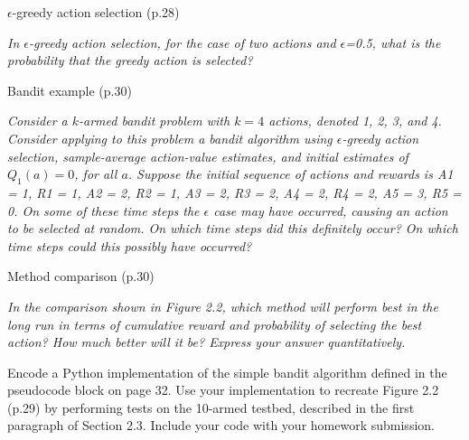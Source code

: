 \documentclass[12pt,letterpaper]{exam}
\newcommand\chapter{1}
\begin{document}
\begin{questions}
	\question%
	$\epsilon$-greedy action selection (p.28)
	
	\emph{In $\epsilon$-greedy action selection, for the case of two actions and $\epsilon$=0.5, 
	what is the probability that the greedy action is selected?}

	\begin{solution}
	
	\end{solution}
	
	\question%
	Bandit example (p.30)
	
	\emph{Consider a $k$-armed bandit problem with $k = 4$ actions, denoted 1, 2, 3, and 4. 
	Consider applying to this problem a bandit algorithm using $\epsilon$-greedy action selection, 
	sample-average action-value estimates, and initial estimates of $Q_1(a) = 0$, for all $a$. 
	Suppose the initial sequence of actions and rewards is 
	A1 = 1, R1 = 1, A2 = 2, R2 = 1, A3 = 2, R3 = 2, A4 = 2, R4 = 2, A5 = 3, R5 = 0. 
	On some of these time steps the $\epsilon$ case may have occurred, causing an action to be selected at random. 
	On which time steps did this definitely occur? On which time steps could this possibly have occurred?}

	\begin{solution}
	
	\end{solution}
	
	\question%
	Method comparison (p.30)
	
	\emph{In the comparison shown in Figure 2.2, which method will perform best in the long run in terms of 
	cumulative reward and probability of selecting the best action? How much better will it be? 
	Express your answer quantitatively.}

	\begin{solution}
	
	\end{solution}

	\renewcommand\chapter{ }


	\question%
	Encode a Python implementation of the simple bandit algorithm defined in the pseudocode block on page 32. 
	Use your implementation to recreate Figure 2.2 (p.29) by performing tests on the 10-armed testbed, 
	described in the first paragraph of Section 2.3. Include your code with your homework submission.
	

\end{questions}
\end{document}
